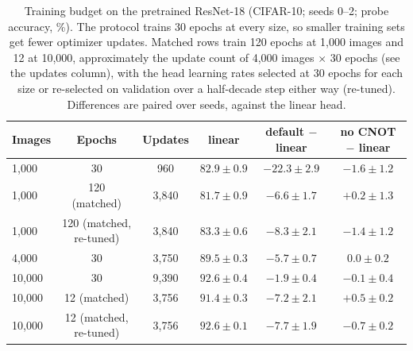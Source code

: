 \begin{table}[h]
\centering
\caption{Training budget on the pretrained ResNet-18 (CIFAR-10; seeds 0--2; probe accuracy, \%).
The protocol trains 30 epochs at every size, so smaller training sets get fewer optimizer
updates. Matched rows train 120 epochs at 1,000 images and 12 at 10,000, approximately the
update count of 4,000 images $\times$ 30 epochs (see the updates column), with the head learning rates selected at 30 epochs for each
size or re-selected on validation over a half-decade step either way (re-tuned). Differences are
paired over seeds, against the linear head.}
\label{tab:ptbudget}
\small
\begin{tabular}{lccccc}
\toprule
Images & Epochs & Updates & linear & default $-$ linear & no CNOT $-$ linear \\
\midrule
1,000 & 30 & 960 & $82.9 \pm 0.9$ & $-22.3 \pm 2.9$ & $-1.6 \pm 1.2$ \\
1,000 & 120 (matched) & 3,840 & $81.7 \pm 0.9$ & $-6.6 \pm 1.7$ & $+0.2 \pm 1.3$ \\
1,000 & 120 (matched, re-tuned) & 3,840 & $83.3 \pm 0.6$ & $-8.3 \pm 2.1$ & $-1.4 \pm 1.2$ \\
4,000 & 30 & 3,750 & $89.5 \pm 0.3$ & $-5.7 \pm 0.7$ & $0.0 \pm 0.2$ \\
10,000 & 30 & 9,390 & $92.6 \pm 0.4$ & $-1.9 \pm 0.4$ & $-0.1 \pm 0.4$ \\
10,000 & 12 (matched) & 3,756 & $91.4 \pm 0.3$ & $-7.2 \pm 2.1$ & $+0.5 \pm 0.2$ \\
10,000 & 12 (matched, re-tuned) & 3,756 & $92.6 \pm 0.1$ & $-7.7 \pm 1.9$ & $-0.7 \pm 0.2$ \\
\bottomrule
\end{tabular}
\end{table}

